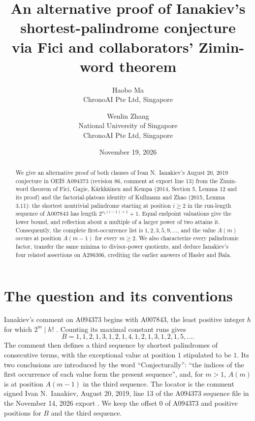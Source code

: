 \documentclass[11pt]{article}
\title{An alternative proof of Ianakiev's\\
shortest-palindrome conjecture\\
via Fici and collaborators' Zimin-word theorem}
\author{Haobo Ma\\\small ChronoAI Pte Ltd, Singapore
\and Wenlin Zhang\\\small National University of Singapore\\
\small ChronoAI Pte Ltd, Singapore}
\date{November 19, 2026}
\begin{document}
\maketitle
\begin{abstract}
We give an alternative proof of both clauses of Ivan N.\ Ianakiev's
August 20, 2019 conjecture in OEIS A094373 (revision 86, comment at
export line 13) from the Zimin-word theorem of Fici, Gagie,
K\"arkk\"ainen and Kempa (2014, Section 5, Lemma 12 and its proof) and the
factorial-plateau identity of Kullmann and Zhao (2015, Lemma 3.11): the
shortest nontrivial palindrome starting at position $i\ge2$ in the
run-length sequence of A007843 has length $2^{\nu_2(i-1)+1}+1$.
Equal endpoint valuations give the lower bound, and reflection about a
multiple of a larger power of two attains it. Consequently, the complete
first-occurrence list is $1,2,3,5,9,\ldots$, and the value $A(m)$ occurs
at position $A(m-1)$ for every $m\ge2$.
We also characterize every palindromic factor, transfer the same minima
to divisor-power quotients, and deduce Ianakiev's four related assertions
on A296306, crediting the earlier answers of Hasler and Bala.
\end{abstract}

\section{The question and its conventions}
Ianakiev's comment on A094373 \cite{oeisA} begins with A007843, the least
positive integer $h$ for which $2^m\mid h!$ \cite{oeisF}. Counting its
maximal constant runs gives
\[
 B=1,1,2,1,3,1,2,1,4,1,2,1,3,1,2,1,5,\ldots.
\]
The comment then defines a third sequence by shortest palindromes of
consecutive terms, with the exceptional value at position $1$ stipulated
to be $1$. Its two conclusions are introduced by the word
``Conjecturally'': ``the indices of the first occurrence of each value
form the present sequence'', and, for $m>1$, $A(m)$ is at position
$A(m-1)$ in the third sequence.
The locator is the comment signed Ivan N.\ Ianakiev, August 20, 2019,
line 13 of the A094373 sequence file in the November 14, 2026 export
\cite{oeisA}. We keep the offset $0$ of A094373 and positive positions
for $B$ and the third sequence.
\end{document}
